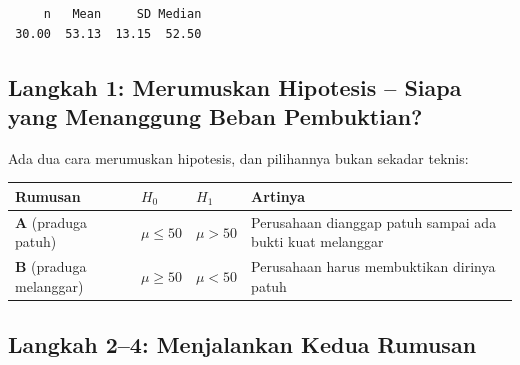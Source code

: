 \documentclass[
  indonesian,
  letterpaper,
]{book}
\newcounter{none} %
\begin{document}
\begin{verbatim}
     n   Mean     SD Median 
 30.00  53.13  13.15  52.50 
\end{verbatim}

\subsection{Langkah 1: Merumuskan Hipotesis -- Siapa yang Menanggung
Beban
Pembuktian?}\label{langkah-1-merumuskan-hipotesis-siapa-yang-menanggung-beban-pembuktian}

Ada dua cara merumuskan hipotesis, dan pilihannya bukan sekadar teknis:

{\def\LTcaptype{none} %
\begin{longtable}[]{@{}
  >{\raggedright\arraybackslash}p{}
  >{\centering\arraybackslash}p{}
  >{\centering\arraybackslash}p{}
  >{\raggedright\arraybackslash}p{}@{}}
\toprule\noalign{}
\begin{minipage}[b]{\linewidth}\raggedright
Rumusan
\end{minipage} & \begin{minipage}[b]{\linewidth}\centering
\(H_0\)
\end{minipage} & \begin{minipage}[b]{\linewidth}\centering
\(H_1\)
\end{minipage} & \begin{minipage}[b]{\linewidth}\raggedright
Artinya
\end{minipage} \\
\midrule\noalign{}
\endhead
\bottomrule\noalign{}
\endlastfoot
\textbf{A} (praduga patuh) & \(\mu \le 50\) & \(\mu > 50\) & Perusahaan
dianggap patuh sampai ada bukti kuat melanggar \\
\textbf{B} (praduga melanggar) & \(\mu \ge 50\) & \(\mu < 50\) &
Perusahaan harus membuktikan dirinya patuh \\
\end{longtable}
}

\subsection{Langkah 2--4: Menjalankan Kedua
Rumusan}\label{langkah-24-menjalankan-kedua-rumusan}
\end{document}

